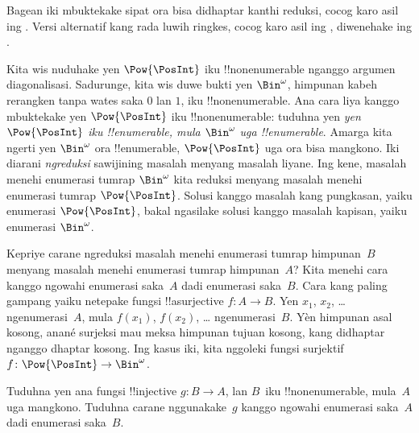 \documentclass[../../../include/open-logic-section]{subfiles}
\begin{document}


\begin{editorial}
  Bagean iki mbuktekake sipat ora bisa didhaptar kanthi reduksi,
  cocog karo asil ing . Versi alternatif kang rada luwih
  ringkes, cocog karo asil ing , diwenehake ing
  .
\end{editorial}

Kita wis nuduhake yen $\Pow{\PosInt}$ iku !!{nonenumerable} nganggo
argumen diagonalisasi. Sadurunge, kita wis duwe bukti yen $\Bin^\omega$,
himpunan kabeh rerangken tanpa wates saka $0$ lan $1$, iku !!{nonenumerable}.
Ana cara liya kanggo mbuktekake yen $\Pow{\PosInt}$ iku !!{nonenumerable}:
tuduhna yen \emph{yen $\Pow{\PosInt}$ iku !!{enumerable}, mula $\Bin^\omega$
  uga !!{enumerable}}. Amarga kita ngerti yen $\Bin^\omega$ ora
!!{enumerable}, $\Pow{\PosInt}$ uga ora bisa mangkono. Iki diarani
\emph{ngreduksi} sawijining masalah menyang masalah liyane. Ing kene,
masalah menehi enumerasi tumrap $\Bin^\omega$ kita reduksi menyang masalah menehi enumerasi tumrap
$\Pow{\PosInt}$. Solusi kanggo masalah kang pungkasan, yaiku enumerasi
$\Pow{\PosInt}$, bakal ngasilake solusi kanggo masalah kapisan, yaiku
enumerasi $\Bin^\omega$.

Kepriye carane ngreduksi masalah menehi enumerasi tumrap himpunan~$B$ menyang
masalah menehi enumerasi tumrap himpunan~$A$? Kita menehi cara kanggo ngowahi enumerasi
saka~$A$ dadi enumerasi saka~$B$. Cara kang paling gampang yaiku netepake
fungsi !!a{surjective} $f\colon A \to B$. Yen $x_1$, $x_2$,
\dots{} ngenumerasi~$A$, mula $f(x_1)$, $f(x_2)$, \dots{}
ngenumerasi~$B$. Yèn himpunan asal kosong, anané surjeksi mau
meksa himpunan tujuan kosong, kang didhaptar nganggo dhaptar kosong.
Ing kasus iki, kita nggoleki fungsi surjektif
$f\colon \Pow{\PosInt} \to \Bin^\omega$.

\begin{prob}
Tuduhna yen ana fungsi !!{injective} $g\colon B \to A$, lan
$B$~iku !!{nonenumerable}, mula~$A$ uga mangkono. Tuduhna carane
nggunakake~$g$ kanggo ngowahi enumerasi saka~$A$ dadi enumerasi saka~$B$.
\end{prob}
\end{document}
